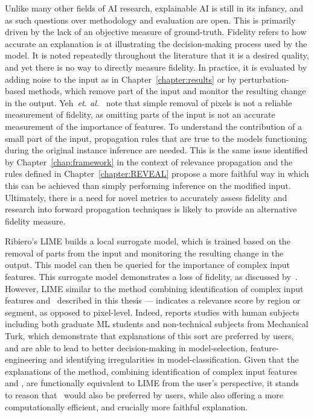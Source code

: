 Unlike many other fields of AI research, explainable AI is still in its infancy, and as such questions over methodology and evaluation are open. This is primarily driven by the lack of an objective measure of ground-truth. Fidelity refers to how accurate an explanation is at illustrating the decision-making process used by the model. It is noted repeatedly throughout the literature that it is a desired quality, and yet there is no way to directly measure fidelity.  In practice, it is evaluated by adding noise to the input as in Chapter~\ref{chapter:results} or by perturbation-based methods, which remove part of the input and monitor the resulting change in the output. Yeh~\textit{et. al.}~\cite{YehHSIR19} note that simple removal of pixels is not a reliable measurement of fidelity, as omitting parts of the input is not an accurate measurement of the importance of features. To understand the contribution of a small part of the input, propagation rules that are true to the models functioning during the original instance inference are needed. This is the same issue identified by Chapter~\ref{chap:framework} in the context of relevance propagation and the rules defined in Chapter~\ref{chapter:REVEAL} propose a more faithful way in which this can be achieved than simply performing inference on the modified input. Ultimately, there is a need for novel metrics to accurately assess fidelity and research into forward propagation techniques is likely to provide an alternative fidelity measure. 

Ribiero's LIME \cite{Ribeiro0G16} builds a local surrogate model, which is trained based on the removal of parts from the input and monitoring the resulting change in the output. This model can then be queried for the importance of complex input features. This surrogate model demonstrates a loss of fidelity, as discussed by~\cite{YehHSIR19}. However, LIME similar to the method combining identification of complex input features and \CTC\ described in this thesis --- indicates a relevance score by region or segment, as opposed to pixel-level. Indeed, \cite{Ribeiro0G16} reports studies with human subjects including both graduate ML students and non-technical subjects from Mechanical Turk, which demonstrate that explanations of this sort are preferred by users, and are able to lead to better decision-making in model-selection, feature-engineering and identifying irregularities in model-classification. Given that the explanations of the method, combining identification of complex input features and \CTC, are functionally equivalent to LIME from the user's perspective, it stands to reason that \CTC\ would also be preferred by users, while also offering a more computationally efficient, and crucially more faithful explanation.

